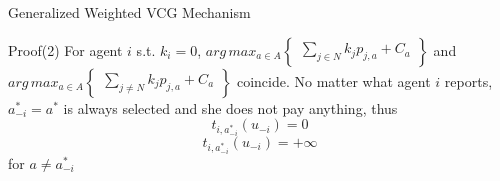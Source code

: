 \begin{frame}{Generalized Weighted VCG Mechanism}
\begin{block}{Proof(2)}
For agent $i$ s.t. $k_{i} = 0$, $arg \,max_{a \in A}\begin{Bmatrix}
\sum _{j \in N} k_{j}p_{j,a} + C_{a}
\end{Bmatrix}$ and $arg \,max_{a \in A}\begin{Bmatrix}
\sum _{j \neq N} k_{j}p_{j,a} + C_{a}
\end{Bmatrix}$ coincide. No matter what agent $i$ reports, $a^{*}_{-i} = a^{*}$ is always selected and she does not pay anything, thus
$$t_{i,a_{-i}^{*}}(u_{-i}) = 0$$
$$t_{i,a_{-i}^{*}}(u_{-i}) = +\infty$$
for $a \neq a_{-i}^{*}$
\end{block}
\end{frame}
